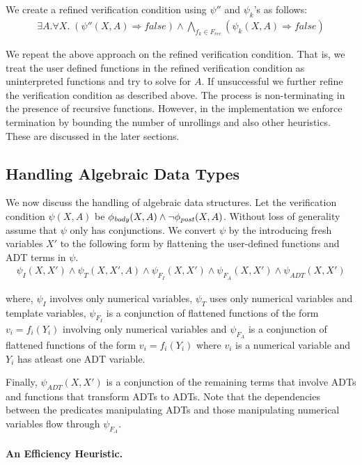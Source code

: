 \documentclass[a4paper,10pt]{article}
\begin{document}
We create a refined verification condition using $\psi''$ and $\psi_k$'s as follows:
%
\begin{align}
\exists A. \forall X. \; (\psi''(X,A) \Rightarrow false) \wedge \bigwedge_{f_k \in F_{rec}} (\psi_k(X,A) \Rightarrow false)
\end{align}

We repeat the above approach on the refined verification condition. That is, we treat the user defined functions in the refined verification condition as uninterpreted functions and try to solve for $A$. If unsuccessful we further refine the verification condition as described above. 
The process is non-terminating in the  presence of recursive functions.
However, in the implementation we enforce termination by bounding the number of unrollings and also other heuristics.
These are discussed in the later sections.

\subsection{Handling Algebraic Data Types} 

We now discuss the handling of algebraic data structures.  
Let the verification condition $\psi(X,A)$ be $\mathit{\phi_{body}}(X,A) \wedge \neg \mathit{\phi_{post}}(X,A)$.
Without loss of generality assume that $\psi$ only has conjunctions.
We convert $\psi$ by the introducing fresh variables $X'$ to the following form by flattening the 
user-defined functions and ADT terms in $\psi$.
%
\begin{align*}
\psi_I(X,X') \wedge \psi_T(X,X',A) \wedge \psi_{F_I}(X,X') \wedge \psi_{F_A}(X,X') \wedge \psi_{ADT}(X,X')
\end{align*}

where, $\psi_I$ involves only numerical variables, $\psi_{T}$ uses only numerical variables and template variables, 
$\psi_{F_I}$ is a conjunction of flattened functions of the form $v_i = f_i(Y_i)$ involving only numerical 
variables and $\psi_{F_A}$ is a conjunction of flattened functions of the form $v_i = f_i(Y_i)$ 
where $v_i$ is a numerical variable and $Y_i$ has atleast one ADT variable. 

Finally, $\psi_{ADT}(X,X')$ is a conjunction of the remaining terms that involve ADTs and functions 
that transform ADTs to ADTs.
Note that the dependencies between the predicates manipulating ADTs and those manipulating 
numerical variables flow through $\psi_{F_A}$. 

\paragraph{An Efficiency Heuristic.}
\end{document}
